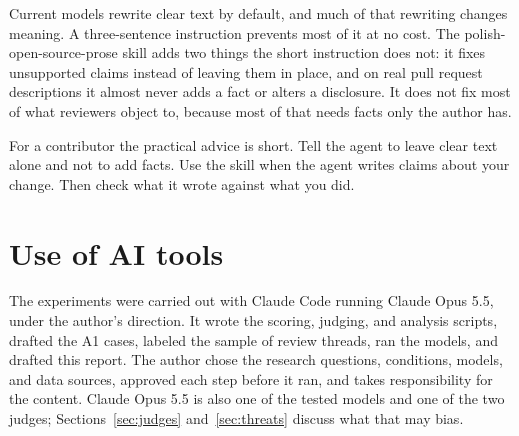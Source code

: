 \documentclass[11pt]{article}
\begin{document}
Current models rewrite clear text by default, and much of that rewriting changes meaning.
A three-sentence instruction prevents most of it at no cost. The polish-open-source-prose
skill adds two things the short instruction does not: it fixes unsupported claims instead
of leaving them in place, and on real pull request descriptions it almost never adds a
fact or alters a disclosure. It does not fix most of what reviewers object to, because
most of that needs facts only the author has.

For a contributor the practical advice is short. Tell the agent to leave clear text alone
and not to add facts. Use the skill when the agent writes claims about your change. Then
check what it wrote against what you did.

\section*{Use of AI tools}

The experiments were carried out with Claude Code running Claude Opus 5.5, under the
author's direction. It wrote the scoring, judging, and analysis scripts, drafted the A1
cases, labeled the sample of review threads, ran the models, and drafted this report. The
author chose the research questions, conditions, models, and data sources, approved each
step before it ran, and takes responsibility for the content. Claude Opus 5.5 is also one
of the tested models and one of the two judges; Sections~\ref{sec:judges}
and~\ref{sec:threats} discuss what that may bias.
\end{document}
